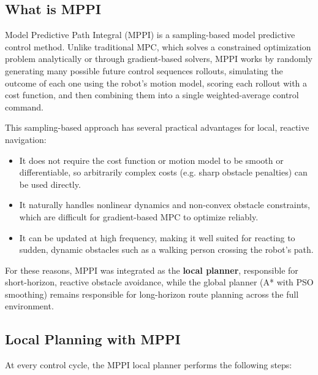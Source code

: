 \subsection{What is MPPI}
\label{subsec:mppi_overview}

Model Predictive Path Integral (MPPI) is a sampling-based model predictive control method. Unlike traditional MPC, which solves a constrained optimization problem analytically or through gradient-based solvers, MPPI works by randomly generating many possible future control sequences rollouts, simulating the outcome of each one using the robot's motion model, scoring each rollout with a cost function, and then combining them into a single weighted-average control command.

This sampling-based approach has several practical advantages for local, reactive navigation:

\begin{itemize}[noitemsep]
	\item It does not require the cost function or motion model to be smooth or differentiable, so arbitrarily complex costs (e.g. sharp obstacle penalties) can be used directly.
	\item It naturally handles nonlinear dynamics and non-convex obstacle constraints, which are difficult for gradient-based MPC to optimize reliably.
	\item It can be updated at high frequency, making it well suited for reacting to sudden, dynamic obstacles such as a walking person crossing the robot's path.
\end{itemize}

For these reasons, MPPI was integrated as the \textbf{local planner}, responsible for short-horizon, reactive obstacle avoidance, while the global planner (A* with PSO smoothing) remains responsible for long-horizon route planning across the full environment.

\subsection{Local Planning with MPPI}
\label{subsec:mppi_local_planning}

At every control cycle, the MPPI local planner performs the following steps:

